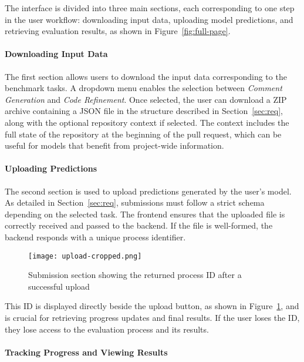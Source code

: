 The interface is divided into three main sections, each corresponding to one step in the user
workflow: downloading input data, uploading model predictions, and retrieving evaluation results, as
shown in Figure~\ref{fig:full-page}.

\paragraph{Downloading Input Data}

The first section allows users to download the input data corresponding to the benchmark tasks. A
dropdown menu enables the selection between \textit{Comment Generation} and \textit{Code
Refinement}. Once selected, the user can download a ZIP archive containing a JSON file in the
structure described in Section~\ref{sec:req}, along with the optional repository context if
selected. The context includes the full state of the repository at the beginning of the pull
request, which can be useful for models that benefit from project-wide information.

\paragraph{Uploading Predictions}

The second section is used to upload predictions generated by the user's model. As detailed in
Section~\ref{sec:req}, submissions must follow a strict schema depending on the selected task. The
frontend ensures that the uploaded file is correctly received and passed to the backend. If the file
is well-formed, the backend responds with a unique process identifier.

\begin{figure}[H]
    \centering
    \texttt{[image: upload-cropped.png]}
    \caption{Submission section showing the returned process ID after a successful upload}
    \label{fig:upload-id}
\end{figure}

This ID is displayed directly beside the upload button, as shown in Figure~\ref{fig:upload-id}, and
is crucial for retrieving progress updates and final results. If the user loses the ID, they lose
access to the evaluation process and its results.

\paragraph{Tracking Progress and Viewing Results}

